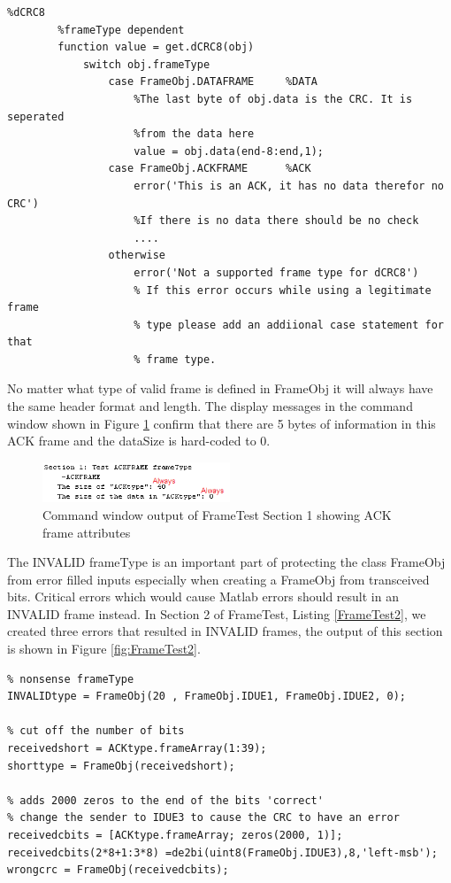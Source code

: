 \begin{lstlisting} 
%dCRC8
        %frameType dependent
        function value = get.dCRC8(obj)
            switch obj.frameType
                case FrameObj.DATAFRAME     %DATA
                    %The last byte of obj.data is the CRC. It is seperated
                    %from the data here
                    value = obj.data(end-8:end,1);
                case FrameObj.ACKFRAME      %ACK
                    error('This is an ACK, it has no data therefor no CRC')
                    %If there is no data there should be no check
					....
				otherwise
                    error('Not a supported frame type for dCRC8')
                    % If this error occurs while using a legitimate frame
                    % type please add an addiional case statement for that
                    % frame type.
\end{lstlisting}

No matter what type of valid frame is defined in FrameObj it will always have the same header format and length. The display messages in the command window shown in Figure \ref{fig:FrameTest1} confirm that there are 5 bytes of information in this ACK frame and the dataSize is hard-coded to 0. 

\begin{figure}[h]
    \includegraphics[width=0.5\textwidth, left]{FrameTest1.PNG}
    \caption{Command window output of FrameTest Section 1 showing ACK frame attributes }
    \label{fig:FrameTest1}
\end{figure}

The INVALID frameType is an important part of protecting the class FrameObj from error filled inputs especially when creating a FrameObj from transceived bits. Critical errors which would cause Matlab errors should result in an INVALID frame instead. In Section 2 of FrameTest, Listing \ref{FrameTest2}, we created three errors that resulted in INVALID frames, the output of this section is shown in Figure \ref{fig:FrameTest2}.

\begin{lstlisting} 
% nonsense frameType
INVALIDtype = FrameObj(20 , FrameObj.IDUE1, FrameObj.IDUE2, 0);

% cut off the number of bits
receivedshort = ACKtype.frameArray(1:39);
shorttype = FrameObj(receivedshort);

% adds 2000 zeros to the end of the bits 'correct'
% change the sender to IDUE3 to cause the CRC to have an error
receivedcbits = [ACKtype.frameArray; zeros(2000, 1)];
receivedcbits(2*8+1:3*8) =de2bi(uint8(FrameObj.IDUE3),8,'left-msb');
wrongcrc = FrameObj(receivedcbits);
\end{lstlisting} 

